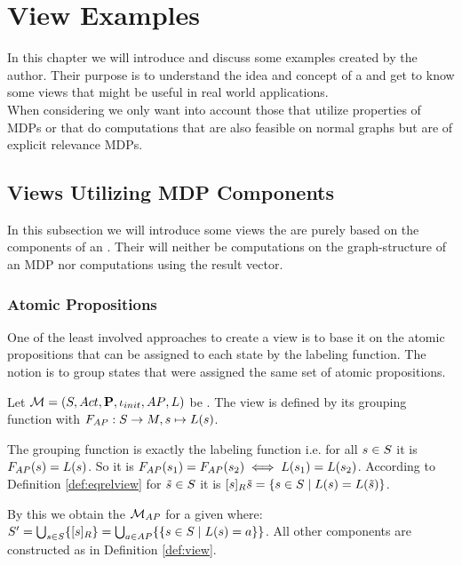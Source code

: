 \documentclass[preview]{standalone}
\begin{document}
\section{View Examples}
In this chapter we will introduce and discuss some \viewN examples created by the author. Their purpose is to understand the idea and concept of a \viewN and get to know some views that might be useful in real world applications. \\
When considering \viewsN we only want into account those that utilize properties of MDPs or that do computations that are also feasible on normal graphs but are of explicit relevance MDPs.
\subsection{Views Utilizing MDP Components}
In this subsection we will introduce some views the are purely based on the components of an \mdpN. Their will neither be computations on the graph-structure of an MDP nor computations using the result vector.
\subsubsection{Atomic Propositions}
One of the least involved approaches to create a view is to base it on the atomic propositions that can be assigned to each state by the labeling function. The notion is to group states that were assigned the same set of atomic propositions. 


\begin{definition}	
	Let ${{{\mathcal{M}}}} = {{({S}, {Act}, {\textbf{P}}, {\iota_{init}}, {AP}, {L})}}$ be \chosengraphtypeN. The view \viewatomicprops is defined by its grouping function \gfctatomicprops \grpfctN with $\gfctatomicprops : \states \to \imggrp, {\state}\mapsto{\labelingfct(\state)}$.
\end{definition}

The grouping function is exactly the labeling function i.e. for all ${s} \in {S}$ it is ${{F_{{AP}}}}({s}) = {L}({s})$. So it is ${{F_{{AP}}}}({s}_1) = {{F_{{AP}}}}({s}_2) \iff {L}({s}_1) = {L}({s}_2)$. According to Definition \ref{def:eqrelview} for ${\tilde{{s}}} \in {S}$ it is ${{[{s}]_{{R}}}}{{\tilde{{s}}}} = \{{s} \in {S} \mid {L}({s}) = {L}({\tilde{{s}}})\}$.

By this we obtain the \viewN ${{{{{\mathcal{M}}}}_{{AP}}}}$ for a given \chosengraphtypeN \chgph where: ${S}' = \bigcup_{{s} \in {S}} \{{{[{s}]_{{R}}}}\} =  \bigcup_{a \in {AP}} \{\{{s} \in {S} \mid {L}({s}) = a\}\}$. All other components are constructed as in Definition \ref{def:view}.
\end{document}

